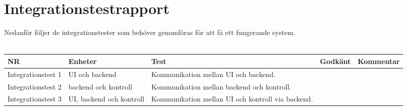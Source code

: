 \documentclass[10pt]{article}
\begin{document}
  

\section{Integrationstestrapport}
Nedanför följer de integrationstester som behöver genomföras för att få ett fungerande system. \\
\\

\noindent
	\begin{tabular}{| p{2.8cm}| p{2cm} | p{5cm}|p{1.2cm}| p{5cm}|}
      		\hline
      		NR&Enheter&Test&Godkänt&Kommentar\\
      		\hline
		Integrationstest 1&UI och backend&Kommunikation mellan UI och backend.&&\\
		\hline
		Integrationstest 2&backend och kontroll&Kommunikation mellan backend och kontroll.&&\\
		\hline
		Integrationstest 3&UI, backend och kontroll&Kommunikation mellan UI och kontroll via backend.&&\\
		\hline
 	 \end{tabular}
 
\end{document}

